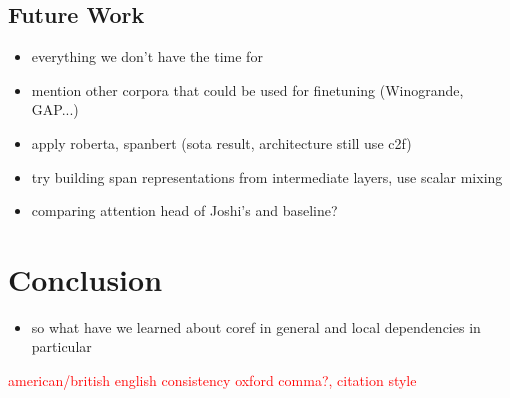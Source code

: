 \documentclass[11pt]{article}
\newcommand\todo[1]{\textcolor{red}{#1}}
\begin{document}
\subsection{Future Work}
\begin{itemize}
\item everything we don't have the time for
\item mention other corpora that could be used for finetuning (Winogrande, GAP...)
\item apply roberta, spanbert (sota result, architecture still use c2f)
\item try building span representations from intermediate layers, use scalar mixing
\item comparing attention head of Joshi's and baseline?

\end{itemize}

\section{Conclusion}

\begin{itemize}
\item so what have we learned about coref in general and local dependencies in particular
\end{itemize}

 \todo{american/british english consistency} 
 \todo{oxford comma?, citation style }

\newpage %
\printbibliography
\end{document}
